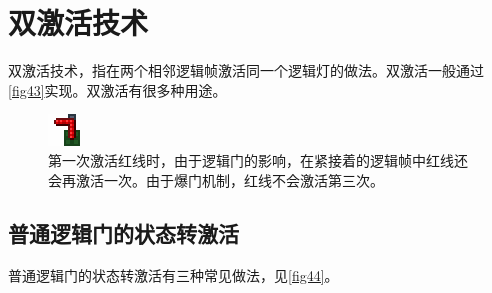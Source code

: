 \section{双激活技术}\label{sec33}
双激活技术，指在两个相邻逻辑帧激活同一个逻辑灯的做法。双激活一般通过\autoref{fig43}实现。双激活有很多种用途。
\begin{figure}[!ht]
\centering
\includegraphics{images/421.png}
\caption{第一次激活红线时，由于逻辑门的影响，在紧接着的逻辑帧中红线还会再激活一次。由于爆门机制，红线不会激活第三次。}\label{fig43}
\end{figure}

\subsection{普通逻辑门的状态转激活}
普通逻辑门的状态转激活有三种常见做法，见\autoref{fig44}。

\begin{figure}[!ht]
\centering
{}
\qquad
{}
\qquad
{}
\caption{}\label{fig44}
\end{figure}

